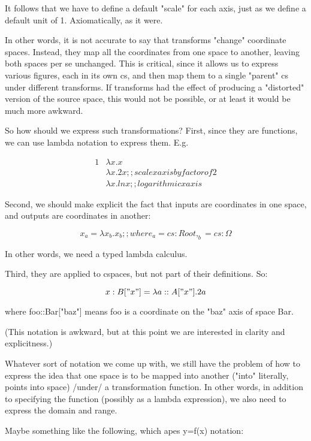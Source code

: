 \documentclass[reqno,12pt]{tufte-handout}
\numberwithin{equation}{subsection}
\numberwithin{equation}{subsection}
\begin{document}
It follows that we have to define a default "scale" for each axis,
just as we define a default unit of 1.  Axiomatically, as it were.

In other words, it is not accurate to say that transforms "change"
coordinate spaces.  Instead, they map all the coordinates from one
space to another, leaving both spaces per se unchanged.  This is
critical, since it allows us to express various figures, each in its
own cs, and then map them to a single "parent" cs under different
transforms.  If transforms had the effect of producing a "distorted"
version of the source space, this would not be possible, or at least
it would be much more awkward.

So how should we express such transformations?  First, since they are
functions, we can use lambda notation to express them.  E.g.

{
  \begin{alignat}{1}
	   & \lambda x.x \\
	   & \lambda x.2x   ;; scale x axis by factor of 2 \\
	   & \lambda x.ln x ;; logarithmic x axis
  \end{alignat}
}

Second, we should make explicit the fact that inputs are coordinates
in one space, and outputs are coordinates in another:

$$x_a = \lambda x_b.x_b  ;; where _a = cs:Root, _b = cs:\Omega$$

In other words, we need a typed lambda calculus.

Third, they are applied to cspaces, but not part of their definitions.
So:

\begin{equation}
  x:B["x"] = \lambda a::A["x"].2a
\end{equation}


where foo::Bar["baz"] means foo is a coordinate on the "baz" axis of space Bar.

(This notation is awkward, but at this point we are interested in
clarity and explicitness.)

Whatever sort of notation we come up with, we still have the problem
of how to express the idea that one space is to be mapped into another
("into" literally, points into space) /under/ a transformation
function.  In other words, in addition to specifying the function
(possibly as a lambda expression), we also need to express the domain
and range.

Maybe something like the following, which apes y=f(x) notation:
\end{document}
